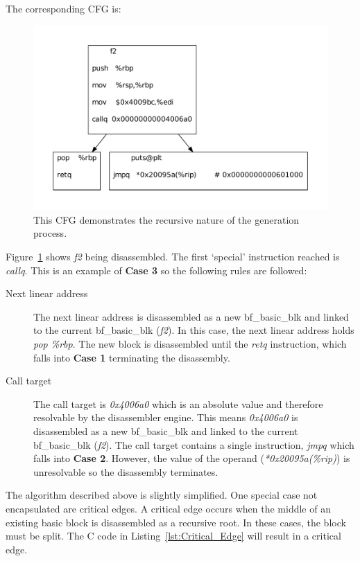 The corresponding CFG is:

\begin{figure}[H]
 \centering
 \includegraphics[scale=0.55]{Jmp_Blk.pdf}
 \caption{This CFG demonstrates the recursive nature of the generation process.}
 \label{fig:Jmp_Blk}
\end{figure}

Figure~\ref{fig:Jmp_Blk} shows \emph{f2} being disassembled. The first `special' instruction reached is \emph{callq}. This is an example of \textbf{Case 3} so the following rules are followed:

\begin{description}
\item [Next linear address] The next linear address is disassembled as a new bf\_basic\_blk and linked to the current bf\_basic\_blk (\emph{f2}). In this case, the next linear address holds \emph{pop \%rbp}. The new block is disassembled until the \emph{retq} instruction, which falls into \textbf{Case 1} terminating the disassembly.
\item [Call target] The call target is \emph{0x4006a0} which is an absolute value and therefore resolvable by the disassembler engine. This means \emph{0x4006a0} is disassembled as a new bf\_basic\_blk and linked to the current bf\_basic\_blk (\emph{f2}). The call target contains a single instruction, \emph{jmpq} which falls into \textbf{Case 2}. However, the value of the operand (\emph{*0x20095a(\%rip)}) is unresolvable so the disassembly terminates.
\end{description}

The algorithm described above is slightly simplified. One special case not encapsulated are critical edges. A critical edge occurs when the middle of an existing basic block is disassembled as a recursive root. In these cases, the block must be split. The C code in Listing~\ref{lst:Critical_Edge} will result in a critical edge.

